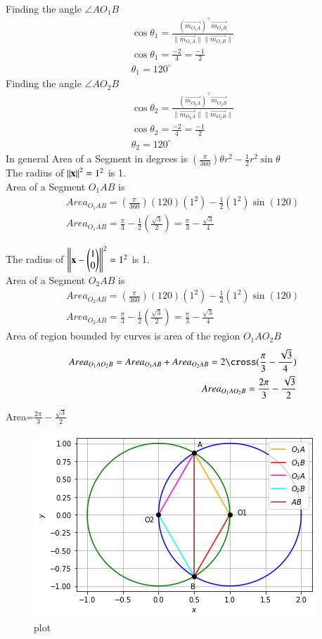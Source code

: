 \documentclass[journal,12pt,twocolumn]{IEEEtran}
\begin{document}
\begin{enumerate}
\begin{align}
\end{align}
Finding the angle $\angle A O_1 B$
\begin{align}
\cos\theta_1 = \frac{ (\vec{m_{O_1A}})^\top \vec{m_{O_1B}} } { \|\vec{m_{O_1A}} \| \|\vec{m_{O_1B}}\|  }\\
\cos\theta_1 = \frac{-2}{4}=\frac{-1}{2}\\
\theta_1 = 120^{\circ} 
\end{align}
Finding the angle $\angle A O_2 B$
\begin{align}
\cos\theta_2 = \frac{ (\vec{m_{O_2A}})^\top \vec{m_{O_2B}} } { \|\vec{m_{O_2A}} \| \|\vec{m_{O_2B}}\|  }\\
\cos\theta_2 = \frac{-2}{4}=\frac{-1}{2}\\
\theta_2 = 120^{\circ} 
\end{align}
In general Area of a Segment in degrees is $ (\frac{\pi}{360}) \theta  r^2 -\frac{1}{2} r^2 \sin\theta $\\

The radius of $ \left\lVert\mathbf{x}\right\rVert ^2 =1 ^2 $ is 1.\\
Area of a Segment $O_1 AB$ is
\begin{align} 
Area_{O_1 AB}= (\frac{\pi}{360})(120)(1^2) -\frac{1}{2}( 1^2) \sin (120)\\
Area_{O_1 AB}= \frac{\pi}{3} - \frac{1}{2}(\frac{\sqrt{3}}{2})
= \frac{\pi}{3} - \frac{\sqrt{3}}{4}
\end{align}

The radius of $ \left\lVert\mathbf{x}-\begin{pmatrix}1 \\0\end{pmatrix}\right\rVert ^2 =1 ^2 $ is 1.\\
Area of a Segment $O_2 AB$ is
\begin{align} 
Area_{O_2 AB}= (\frac{\pi}{360})(120)(1^2) -\frac{1}{2}( 1^2) \sin (120)\\
Area_{O_2 AB}= \frac{\pi}{3} - \frac{1}{2}(\frac{\sqrt{3}}{2})
= \frac{\pi}{3} - \frac{\sqrt{3}}{4}
\end{align}
Area of region bounded by curves is area of the region $O_1 A O_2 B $
\begin{align}
Area_{O_1 A O_2 B } =Area_{O_1 AB} + Area_{O_2 AB}= 2\cross (\frac{\pi}{3} - \frac{\sqrt{3}}{4})\\
Area_{O_1 A O_2 B } =\frac{2\pi}{3} - \frac{\sqrt{3}}{2}
\end{align}
\end{enumerate}
\begin{center}
    \huge{Area=$\frac{2\pi}{3} - \frac{\sqrt{3}}{2}$}
\end{center}

\begin{figure}[htp]
    \includegraphics[scale=0.74]{figure_assignment5.png}
    \caption{plot}
\end{figure}
\end{document}
